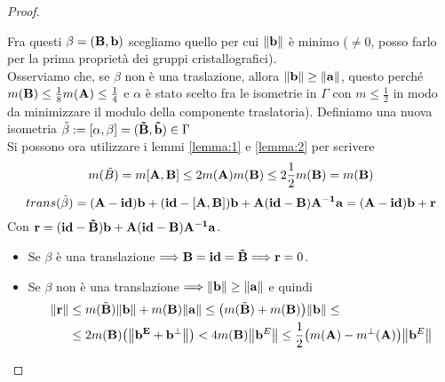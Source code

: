 \documentclass[a4paper,11pt,openright,twoside	]{book}
\begin{document}
\begin{proof}
\begin{figure}[h!]
\caption{}
\label{fig:ea}
\end{figure}
Fra questi $\beta = (\vb{B, b})$ scegliamo quello per cui $\norm{\vb{b}}$ è minimo ($\neq 0$, posso farlo per la prima proprietà dei gruppi cristallografici). \\
Osserviamo che, se $\beta$ non è una traslazione, allora $ \norm{\vb{b}} \geq \norm{\vb{a}}$, questo perché $m(\vb{B}) \leq \frac{1}{8}m(\vb{A}) \leq \frac{1}{4}$ e $\alpha$ è stato scelto fra le isometrie in $\Gamma$ con $m \leq \frac{1}{2}$ in modo da minimizzare il modulo della componente traslatoria).  
Definiamo una nuova isometria $ \tilde{\beta} := [\vb{\alpha,\beta}] = (\vb{\tilde{B}, \tilde{b}})\in \Gamma$  \\
Si possono ora utilizzare i lemmi \ref{lemma:1} e \ref{lemma:2} per scrivere 
\[ m(\tilde{B} ) = m[\vb{A,B}] \leq 2m(\vb{A}) m(\vb{B}) \leq 2 \frac{1}{2}m(\vb{B}) = m(\vb{B}) \]
\[ trans( \tilde{\beta}) = \vb{(A-id)b + (id-[A,B])b + A(id-B)A^{-1}a} = \vb{(A-id)b + r}\]
Con $\vb{r} = \vb{(id-\tilde{B})b + A(id-B)A^{-1}a}$.
\begin{itemize}
\item Se $\beta$  è una translazione $\Longrightarrow \vb{B = id = \tilde{B}} \Longrightarrow \vb{r} = 0$. 
\item Se $\beta$ non è una translazione $\Longrightarrow \norm{\vb{b}} \geq \norm{\vb{a}}$  e quindi \\
\begin{equation}
\begin{split}
\norm{\vb{r}} & \leq m(\tilde{\vb{B}}) \norm{\vb{b}} + m(\vb{B}) \norm{\vb{a}}  \leq \big( m(\tilde{\vb{B}}) + m(\vb{B}) \big) \norm{\vb{b}} \leq\\
& \leq 2m( \vb{B})\big(\norm{\vb{b^{E}+ b^{\perp}}} \big) < 4 m(\vb{B}) \norm{\vb{b}^{E}} \leq \frac{1}{2} \big( m(\vb{A}) - m^{\perp}(\vb{A}) \big)\norm{\vb{b}^{E}} \\

\end{split}
\end{equation}
\end{itemize}
\end{proof}
\end{document}
